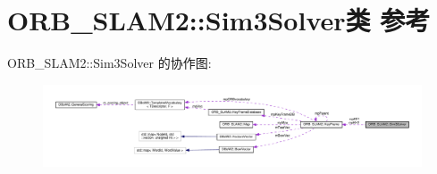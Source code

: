 \hypertarget{classORB__SLAM2_1_1Sim3Solver}{\section{O\-R\-B\-\_\-\-S\-L\-A\-M2\-:\-:Sim3\-Solver类 参考}
\label{classORB__SLAM2_1_1Sim3Solver}
}


O\-R\-B\-\_\-\-S\-L\-A\-M2\-:\-:Sim3\-Solver 的协作图\-:
\nopagebreak
\begin{figure}[H]
\begin{center}
\leavevmode
\includegraphics[width=350pt]{classORB__SLAM2_1_1Sim3Solver__coll__graph}
\end{center}
\end{figure}
